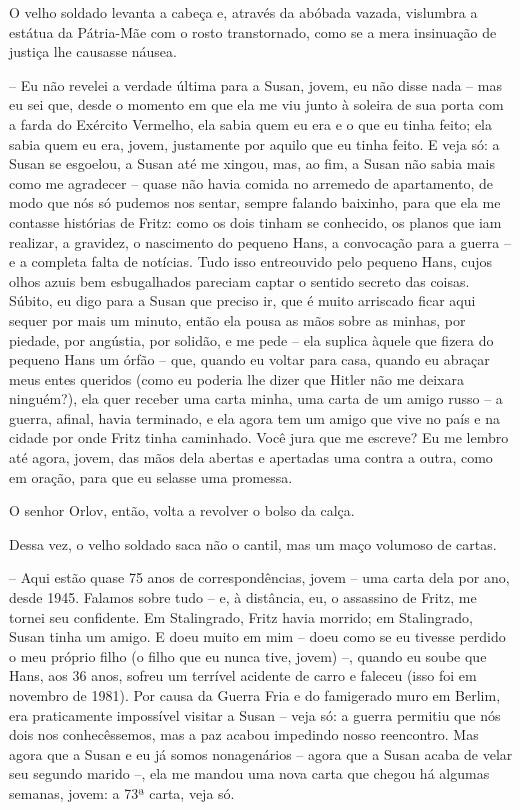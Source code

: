 O velho soldado levanta a cabeça e, através da abóbada vazada, vislumbra
a estátua da Pátria-Mãe com o rosto transtornado, como se a mera
insinuação de justiça lhe causasse náusea.

-- Eu não revelei a verdade última para a Susan, jovem, eu não disse
nada -- mas eu sei que, desde o momento em que ela me viu junto à
soleira de sua porta com a farda do Exército Vermelho, ela sabia quem eu
era e o que eu tinha feito; ela sabia quem eu era, jovem, justamente por
aquilo que eu tinha feito. E veja só: a Susan se esgoelou, a Susan até
me xingou, mas, ao fim, a Susan não sabia mais como me agradecer --
quase não havia comida no arremedo de apartamento, de modo que nós só
pudemos nos sentar, sempre falando baixinho, para que ela me contasse
histórias de Fritz: como os dois tinham se conhecido, os planos que iam
realizar, a gravidez, o nascimento do pequeno Hans, a convocação para a
guerra -- e a completa falta de notícias. Tudo isso entreouvido pelo
pequeno Hans, cujos olhos azuis bem esbugalhados pareciam captar o
sentido secreto das coisas. Súbito, eu digo para a Susan que preciso ir,
que é muito arriscado ficar aqui sequer por mais um minuto, então ela
pousa as mãos sobre as minhas, por piedade, por angústia, por solidão, e
me pede -- ela suplica àquele que fizera do pequeno Hans um órfão --
que, quando eu voltar para casa, quando eu abraçar meus entes queridos
(como eu poderia lhe dizer que Hitler não me deixara ninguém?), ela quer
receber uma carta minha, uma carta de um amigo russo -- a guerra,
afinal, havia terminado, e ela agora tem um amigo que vive no país e na
cidade por onde Fritz tinha caminhado. Você jura que me escreve? Eu me
lembro até agora, jovem, das mãos dela abertas e apertadas uma contra a
outra, como em oração, para que eu selasse uma promessa.

O senhor Orlov, então, volta a revolver o bolso da calça.

Dessa vez, o velho soldado saca não o cantil, mas um maço volumoso de
cartas.

-- Aqui estão quase 75 anos de correspondências, jovem -- uma carta dela
por ano, desde 1945. Falamos sobre tudo -- e, à distância, eu, o
assassino de Fritz, me tornei seu confidente. Em Stalingrado, Fritz
havia morrido; em Stalingrado, Susan tinha um amigo. E doeu muito em mim
-- doeu como se eu tivesse perdido o meu próprio filho (o filho que eu
nunca tive, jovem) --, quando eu soube que Hans, aos 36 anos, sofreu um
terrível acidente de carro e faleceu (isso foi em novembro de 1981). Por
causa da Guerra Fria e do famigerado muro em Berlim, era praticamente
impossível visitar a Susan -- veja só: a guerra permitiu que nós dois
nos conhecêssemos, mas a paz acabou impedindo nosso reencontro. Mas
agora que a Susan e eu já somos nonagenários -- agora que a Susan acaba
de velar seu segundo marido --, ela me mandou uma nova carta que chegou
há algumas semanas, jovem: a 73ª carta, veja só.

